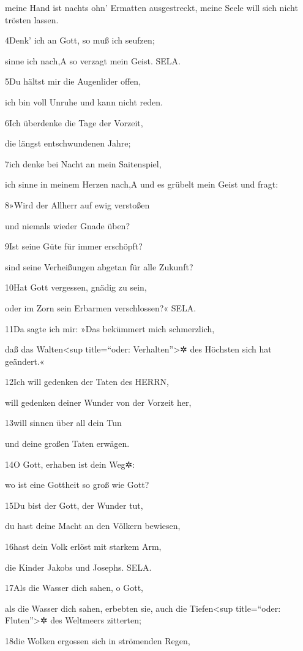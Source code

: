 meine Hand ist nachts ohn' Ermatten ausgestreckt, meine Seele will sich
nicht trösten lassen.

4Denk' ich an Gott, so muß ich seufzen;

sinne ich nach,{A} so verzagt mein Geist. SELA.

5Du hältst mir die Augenlider offen,

ich bin voll Unruhe und kann nicht reden.

6Ich überdenke die Tage der Vorzeit,

die längst entschwundenen Jahre;

7ich denke bei Nacht an mein Saitenspiel,

ich sinne in meinem Herzen nach,{A} und es grübelt mein Geist und fragt:

8»Wird der Allherr auf ewig verstoßen

und niemals wieder Gnade üben?

9Ist seine Güte für immer erschöpft?

sind seine Verheißungen abgetan für alle Zukunft?

10Hat Gott vergessen, gnädig zu sein,

oder im Zorn sein Erbarmen verschlossen?« SELA.

11Da sagte ich mir: »Das bekümmert mich schmerzlich,

daß das Walten\textless sup title=``oder: Verhalten''\textgreater✲ des
Höchsten sich hat geändert.«

12Ich will gedenken der Taten des HERRN,

will gedenken deiner Wunder von der Vorzeit her,

13will sinnen über all dein Tun

und deine großen Taten erwägen.

14O Gott, erhaben ist dein Weg✲:

wo ist eine Gottheit so groß wie Gott?

15Du bist der Gott, der Wunder tut,

du hast deine Macht an den Völkern bewiesen,

16hast dein Volk erlöst mit starkem Arm,

die Kinder Jakobs und Josephs. SELA.

17Als die Wasser dich sahen, o Gott,

als die Wasser dich sahen, erbebten sie, auch die Tiefen\textless sup
title=``oder: Fluten''\textgreater✲ des Weltmeers zitterten;

18die Wolken ergossen sich in strömenden Regen,

